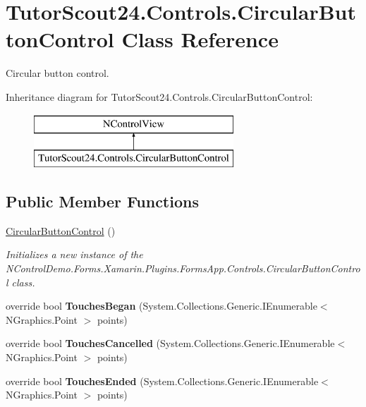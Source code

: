 \hypertarget{class_tutor_scout24_1_1_controls_1_1_circular_button_control}{}\section{Tutor\+Scout24.\+Controls.\+Circular\+Button\+Control Class Reference}
\label{class_tutor_scout24_1_1_controls_1_1_circular_button_control}


Circular button control.  


Inheritance diagram for Tutor\+Scout24.\+Controls.\+Circular\+Button\+Control\+:\begin{figure}[H]
\begin{center}
\leavevmode
\includegraphics[height=2.000000cm]{class_tutor_scout24_1_1_controls_1_1_circular_button_control}
\end{center}
\end{figure}
\subsection*{Public Member Functions}
\begin{DoxyCompactItemize}
\item 
\mbox{\hyperlink{class_tutor_scout24_1_1_controls_1_1_circular_button_control_a6c8ec4488cf7f6c670146060516a669f}{Circular\+Button\+Control}} ()
\begin{DoxyCompactList}\small\item\em Initializes a new instance of the N\+Control\+Demo.\+Forms.\+Xamarin.\+Plugins.\+Forms\+App.\+Controls.\+Circular\+Button\+Control class. \end{DoxyCompactList}\item 
\mbox{\label{class_tutor_scout24_1_1_controls_1_1_circular_button_control_a480ba0d11e196f1be0684a8e3988660d}} 
override bool {\bfseries Touches\+Began} (System.\+Collections.\+Generic.\+I\+Enumerable$<$ N\+Graphics.\+Point $>$ points)
\item 
\mbox{\label{class_tutor_scout24_1_1_controls_1_1_circular_button_control_a3a53c70dcece7dd4c504ad2e5a15799d}} 
override bool {\bfseries Touches\+Cancelled} (System.\+Collections.\+Generic.\+I\+Enumerable$<$ N\+Graphics.\+Point $>$ points)
\item 
\mbox{\label{class_tutor_scout24_1_1_controls_1_1_circular_button_control_ad37f67d1aa9356c6fbc97d16de29d1b1}} 
override bool {\bfseries Touches\+Ended} (System.\+Collections.\+Generic.\+I\+Enumerable$<$ N\+Graphics.\+Point $>$ points)
\end{DoxyCompactItemize}
